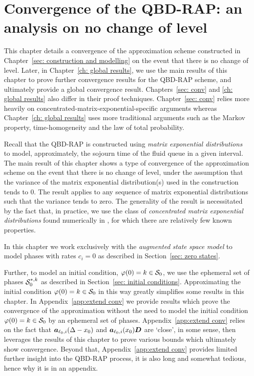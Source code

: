 \chapter{Convergence of the QBD-RAP: an analysis on no change of level\label{sec: conv}}
This chapter details a convergence of the approximation scheme constructed in Chapter~\ref{sec: construction and modelling} on the event that there is no change of level. Later, in Chapter~\ref{ch: global results}, we use the main results of this chapter to prove further convergence results for the QBD-RAP scheme, and ultimately provide a global convergence result. Chapters~\ref{sec: conv} and \ref{ch: global results} also differ in their proof techniques. Chapter~\ref{sec: conv} relies more heavily on concentrated-matrix-exponential-specific arguments whereas Chapter~\ref{ch: global results} uses more traditional arguments such as the Markov property, time-homogeneity and the law of total probability.  

Recall that the QBD-RAP is constructed using \emph{matrix exponential distributions} to model, approximately, the sojourn time of the fluid queue in a given interval. The main result of this chapter shows a type of convergence of the approximation scheme on the event that there is no change of level, under the assumption that the variance of the matrix exponential distribution(s) used in the construction tends to 0.  
The result applies to any sequence of matrix exponential distributions such that the variance tends to zero. The generality of the result is necessitated by the fact that, in practice, we use the class of \emph{concentrated matrix exponential distributions} found numerically in \citep{hht2020}, for which there are relatively few known properties.

In this chapter we work exclusively with the \emph{augmented state space model} to model phases with rates \(c_i=0\) as described in Section~\ref{sec: zero states}. 

Further, to model an initial condition, \(\varphi(0)=k\in\mathcal{S}_0\), we use the ephemeral set of phases \(\mathcal{S}_0^{*,k}\) as described in Section~\ref{sec: initial conditions}. Approximating the initial condition \(\varphi(0)=k\in\mathcal{S}_0\) in this way greatly simplifies some results in this chapter. In Appendix~\ref{app:extend conv} we provide results which prove the convergence of the approximation without the need to model the initial condition \(\varphi(0)=k\in\mathcal{S}_0\) by an ephemeral set of phases. Appendix~\ref{app:extend conv} relies on the fact that \(\boldsymbol a_{\ell_0,i}(\Delta - x_0)\) and \(\boldsymbol a_{\ell_0,i}(x_0)\boldsymbol D\) are `close', in some sense, then leverages the results of this chapter to prove various bounds which ultimately show convergence. Beyond that, Appendix~\ref{app:extend conv} provides limited further insight into the QBD-RAP process, it is also long and somewhat tedious, hence why it is in an appendix. 

